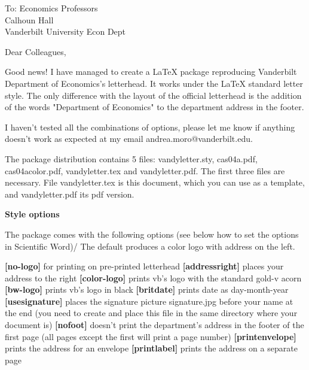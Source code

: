 \documentclass[color-logo]{letter}
\begin{document}
\begin{letter}{
To: Economics Professors\\
Calhoun Hall \\
Vanderbilt University Econ Dept}

\opening{
Dear Colleagues,
}


Good news! I have managed to create a LaTeX package reproducing Vanderbilt
Department of Economics's letterhead. It works under the LaTeX standard
letter style. The only difference with the layout of the official letterhead
is the addition of the words "Department of Economics" to the department
address in the footer.

I haven't tested all the combinations of options, please let me know if anything doesn't
work as expected at my email andrea.moro@vanderbilt.edu. 

The package distribution contains 5
files: vandyletter.sty, cas04a.pdf, cas04acolor.pdf, vandyletter.tex and
vandyletter.pdf. The first three files are necessary. File vandyletter.tex
is this document, which you can use as a template, and vandyletter.pdf its
pdf version. \bigskip

\textbf{Style options}

The package comes with the following options (see below how to set the
options in Scientific Word)/ The default produces a color logo with address on the left.

\textbf{[no-logo]} for printing on pre-printed letterhead\vspace{.8ex} \newline 
\textbf{[addressright]} places your address to the right\vspace{.8ex} \newline 
\textbf{[color-logo]} prints vb's logo with the standard gold-v acorn \vspace{.8ex} \newline 
\textbf{[bw-logo]} prints vb's logo in black\vspace{.8ex} \newline 
\textbf{[britdate]} prints date as day-month-year\vspace{.8ex} \newline 
\textbf{[usesignature]} places the signature picture signature.jpg before your name
at the end (you need to create and place this file in the same directory
where your document is)\vspace{.8ex} \newline 
\textbf{[nofoot]} doesn't print the department's address in the footer of the first
page (all pages except the first will print a page number) \vspace{.8ex} \newline 
\textbf{[printenvelope]}
prints the address for an envelope \vspace{.8ex} \newline 
\textbf{[printlabel]} prints the address on a separate page \vspace{.8ex} \newline 



\end{letter}
\end{document}
